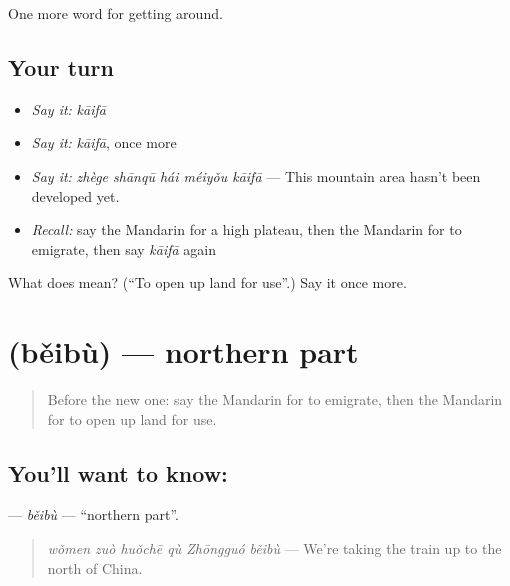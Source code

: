 \begin{grammarlens}[title={What you've built}]
One more word for getting around.
\end{grammarlens}

\subsection*{Your turn}
\begin{itemize}
\raggedright
  \item \emph{Say it:} \emph{kāifā}
  \item \emph{Say it:} \emph{kāifā}, once more
  \item \emph{Say it:} \emph{zhège shānqū hái méiyǒu kāifā} — This mountain area hasn't been developed yet.
  \item \emph{Recall:} say the Mandarin for a high plateau, then the Mandarin for to emigrate, then say \emph{kāifā} again
\end{itemize}

\begin{tcolorbox}[breakable,colback=teal!4,colframe=teal!35!black,title={Before you move on}]
What does  mean? (\textquotedblleft{}To open up land for use\textquotedblright{}.) Say it once more.
\end{tcolorbox}
\section[\texorpdfstring{\zh{北部} (běibù)}{北部 (běibù)}]{ (běibù) — northern part}

\label{lesson:ZH-C438-beibu}



\begin{quote}
Before the new one: say the Mandarin for to emigrate, then the Mandarin for to open up land for use.
\end{quote}

\subsection*{You'll want to know: }
\textbf{} — \emph{běibù} — \textquotedblleft{}northern part\textquotedblright{}.

\begin{quote}
\textbf{} \emph{wǒmen zuò huǒchē qù Zhōngguó běibù} — We're taking the train up to the north of China.
\end{quote}


